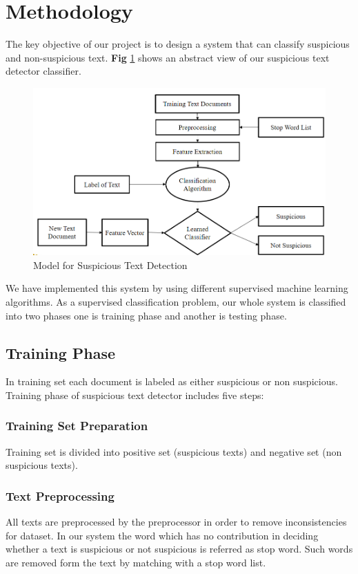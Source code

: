 \section{\textbf{Methodology}}
The key objective of our project is to design a system that can classify suspicious and non-suspicious text. \textbf{Fig} \ref{fig:proposed_model} shows an abstract view of our suspicious text detector classifier.

\begin{figure}[h!]
\centering
  \includegraphics[scale=0.365]{Figures/proposed_model.PNG}
  \caption{ Model for Suspicious Text Detection}
  \label{fig:proposed_model}
\end{figure}

We have implemented this system by using different supervised machine learning algorithms. As a supervised classification problem, our whole system is classified into two phases one is training phase and another is testing phase.
\subsection{\textbf {Training Phase}}
In training set each document is labeled as either suspicious or non suspicious. Training phase of suspicious text detector includes five steps:
\subsubsection{\textbf{Training Set Preparation}}
Training set is divided into positive set (suspicious texts) and negative set (non suspicious texts).
\subsubsection{\textbf{Text Preprocessing}}
All texts are preprocessed by the preprocessor in order to remove inconsistencies for dataset. In our system the word which has no contribution in deciding whether a text is suspicious or not suspicious is referred as stop word. Such words are removed form the text by matching with a stop word list. 

